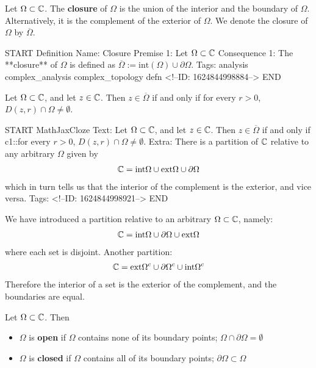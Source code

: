 \documentclass{memoir}
\begin{document}
\begin{defn}[Closure]
	Let \(\Omega \subset \mathbb{C}\). The \textbf{closure} of \(\Omega\) is the union of the interior and the boundary of \(\Omega\). Alternatively, it is the complement of the exterior of \(\Omega\). We denote the closure of \(\Omega\) by \(\overline{\Omega}\).
\end{defn}

\begin{anki}
START
Definition
Name: Closure
Premise 1: Let \(\Omega\subset \mathbb{C}\)
Consequence 1: The **closure** of \(\Omega\) is defined as \(\overline{\Omega} := \textrm{int} (\Omega) \cup \partial \Omega\).
Tags: analysis complex_analysis complex_topology defn
<!--ID: 1624844998884-->
END
\end{anki}

\begin{prop}
	Let \(\Omega\subset \mathbb{C}\), and let \(z \in \mathbb{C}\). Then \(z \in \overline{\Omega}\) if and only if for every \(r>0\), \(D(z,r) \cap \Omega \neq \emptyset\).
\end{prop}

\begin{anki}
START
MathJaxCloze
Text: Let \(\Omega\subset \mathbb{C}\), and let \(z \in \mathbb{C}\). Then \(z \in \overline{\Omega}\) if and only if {{c1::for every \(r>0\), \(D(z,r) \cap \Omega \neq \emptyset\)}}.
Extra: There is a partition of \(\mathbb{C}\) relative to any arbitrary \(\Omega\) given by
\begin{align*}
	\mathbb{C} = \textrm{int}\Omega \cup \textrm{ext}\Omega \cup \partial \Omega
\end{align*}
which in turn tells us that the interior of the complement is the exterior, and vice versa.
Tags: 
<!--ID: 1624844998921-->
END
\end{anki}


We have introduced a partition relative to an arbitrary \(\Omega \subset \mathbb{C}\), namely:
\begin{align*}
	\mathbb{C} = \textrm{int} \Omega \cup \partial \Omega \cup \textrm{ext} \Omega
\end{align*}
where each set is disjoint. Another partition:
\begin{align*}
	\mathbb{C} = \textrm{ext}\Omega^{c} \cup \partial \Omega^{c} \cup \textrm{int}\Omega^{c} 
\end{align*}
Therefore the interior of a set is the exterior of the complement, and the boundaries are equal.
\begin{defn}
	Let \(\Omega\subset \mathbb{C}\). Then
	\begin{itemize}
		\item \(\Omega\) is \textbf{open} if \(\Omega\) contains none of its boundary points; \(\Omega \cap \partial \Omega = \emptyset\)
		\item \(\Omega\) is \textbf{closed} if \(\Omega\) contains all of its boundary points; \(\partial \Omega \subset \Omega\)
	\end{itemize}
\end{defn}
\end{document}
